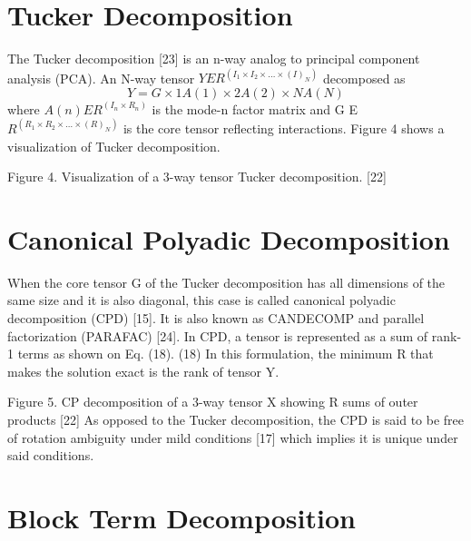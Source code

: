 \section{Tucker Decomposition}
The Tucker decomposition [23] is an n-way analog to principal component analysis (PCA).  An N-way tensor $Y E R^(I_1×I_2×…×( I)_N )$ decomposed as
\begin{equation}
	Y=G×1A(1)×2 A(2)×NA(N)
\end{equation}
where $A(n) E R^(I_n×R_n )$ is the mode-n factor matrix and G E $R^(R_1×R_2×…×(R)_N )$ is the core tensor reflecting interactions.  Figure 4 shows a visualization of Tucker decomposition.

Figure 4. Visualization of a 3-way tensor Tucker decomposition. [22]

\section{Canonical Polyadic Decomposition}
When the core tensor G of the Tucker decomposition has all dimensions of the same size and it is also diagonal, this case is called canonical polyadic decomposition (CPD) [15].  It is also known as CANDECOMP and parallel factorization (PARAFAC) [24].   In CPD, a tensor is represented as a sum of rank-1 terms as shown on Eq. (18).
(18)
In this formulation, the minimum R that makes the solution exact is the rank of tensor Y.

Figure 5.  CP decomposition of a 3-way tensor X showing R sums of  outer products [22]
As opposed to the Tucker decomposition, the CPD is said to be free of rotation ambiguity under mild conditions [17] which implies it is unique under said conditions.

\section{Block Term Decomposition}

